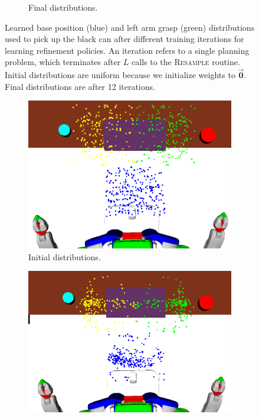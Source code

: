 \begin{figure}[t]
\begin{subfigure}[b]{0.35\linewidth}
    \caption{Final distributions.}
  \end{subfigure}
  \caption{\small{Learned base position (blue) and left arm grasp (green) distributions used to
pick up the black can after different training iterations for learning refinement policies.
An iteration refers to a single planning problem,
which terminates after $L$ calls to the \textsc{Resample} routine.
Initial distributions are uniform because we initialize weights to $\vec{\mathbf{0}}$.
Final distributions are after 12 iterations.}}
  \label{fig:training}
\end{figure}

\begin{figure}[t]
  \centering
  \begin{subfigure}[b]{0.45\linewidth}
    \includegraphics[width=\textwidth]{images/dinner_tray_initial.png}
    \caption{Initial distributions.}
  \end{subfigure}
  \begin{subfigure}[b]{0.45\linewidth}
    \includegraphics[width=\textwidth]{images/dinner_tray_final.png}

\end{subfigure}
\end{figure}
